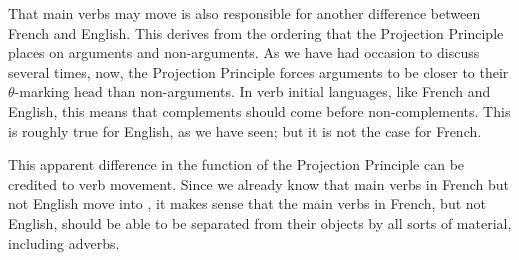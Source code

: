 That main verbs may move is also responsible for another difference between French and English. This derives from the ordering that the Projection Principle places on arguments and non-arguments. As we have had occasion to discuss several times, now, the Projection Principle forces arguments to be closer to their \mbox{$\theta$-marking} head than non-arguments. In verb initial languages, like French and English, this means that complements should come before non-complements. This is roughly true for English, as we have seen; but it is not the case for French.
\begin{exe}
	\ex \label{ex4:51.3}
	\begin{xlist}
	\end{xlist}
\end{exe}
This apparent difference in the function of the Projection Principle can be credited to verb movement. Since we already know that main verbs in French but not English move into , it makes sense that the main verbs in French, but not English, should be able to be separated from their objects by all sorts of material, including adverbs.

